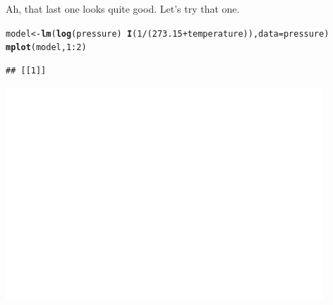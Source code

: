 \documentclass[twoside]{book}\usepackage[]{graphicx}\usepackage[]{xcolor}
\makeatletter
\def\maxwidth{ %
  \ifdim\Gin@nat@width>\linewidth
    \linewidth
  \else
    \Gin@nat@width
  \fi
}
\newcommand{\hlnum}[1]{\textcolor[rgb]{0.686,0.059,0.569}{#1}}%
\newcommand{\hlopt}[1]{\textcolor[rgb]{0,0,0}{#1}}%
\newcommand{\hlstd}[1]{\textcolor[rgb]{0.345,0.345,0.345}{#1}}%
\newcommand{\hlkwb}[1]{\textcolor[rgb]{0.69,0.353,0.396}{#1}}%
\newcommand{\hlkwc}[1]{\textcolor[rgb]{0.333,0.667,0.333}{#1}}%
\newcommand{\hlkwd}[1]{\textcolor[rgb]{0.737,0.353,0.396}{\textbf{#1}}}%
\newenvironment{kframe}{%
 \def\at@end@of@kframe{}%
 \ifinner\ifhmode%
  \def\at@end@of@kframe{\end{minipage}}%
  \begin{minipage}{\columnwidth}%
 \fi\fi%
 \def\FrameCommand##1{\hskip\@totalleftmargin \hskip-\fboxsep
 \colorbox{shadecolor}{##1}\hskip-\fboxsep
     \hskip-\linewidth \hskip-\@totalleftmargin \hskip\columnwidth}%
 \MakeFramed {\advance\hsize-\width
   \@totalleftmargin\z@ \linewidth\hsize
   \@setminipage}}%
 {\par\unskip\endMakeFramed%
 \at@end@of@kframe}
\newenvironment{knitrout}{}{} %
\makeatother
\begin{document}
\begin{solution}
\begin{knitrout}
\end{knitrout}

Ah, that last one looks quite good.  Let's try that one.
\begin{knitrout}
\color{fgcolor}\begin{kframe}
\begin{alltt}
\hlstd{model} \hlkwb{<-} \hlkwd{lm}\hlstd{(}\hlkwd{log}\hlstd{(pressure)} \hlopt{~} \hlkwd{I}\hlstd{(}\hlnum{1}\hlopt{/}\hlstd{(}\hlnum{273.15} \hlopt{+} \hlstd{temperature)),} \hlkwc{data} \hlstd{= pressure)}
\hlkwd{mplot}\hlstd{(model,} \hlnum{1}\hlopt{:}\hlnum{2}\hlstd{)}
\end{alltt}
\begin{verbatim}
## [[1]]
\end{verbatim}


{\ttfamily\noindent\bfseries\color{errorcolor}{\#\# Error in FUN(X[[i]], ...): object '.resid' not found}}\end{kframe}

{\centering \includegraphics[width=\maxwidth]{figures/fig-unnamed-chunk-262-1} 

}




\end{knitrout}
\end{solution}
\end{document}
